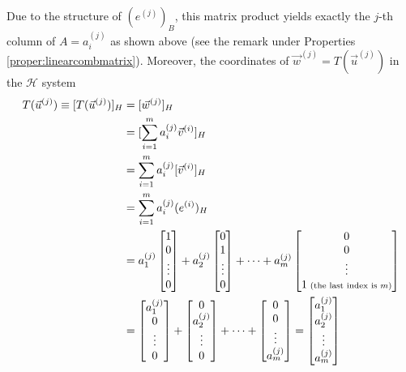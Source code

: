 Due to the structure of $(e^{(j)})_B$, this matrix product yields exactly the $j$-th column of $A = a_i^{(j)}$ as shown above (see the remark under Properties \ref{proper:linearcombmatrix}). Moreover, the coordinates of $\vec{w}^{(j)} = T(\vec{u}^{(j)})$ in the $\mathcal{H}$ system
\begin{align*}
T(\vec{u}^{(j)}) \equiv [T(\vec{u}^{(j)})]_H &= [\vec{w}^{(j)}]_H \\
&= [\sum_{i=1}^{m} a_i^{(j)}\vec{v}^{(i)}]_H \\
&= \sum_{i=1}^{m} a_i^{(j)}[\vec{v}^{(i)}]_H \\
&= \sum_{i=1}^{m} a_i^{(j)}(e^{(i)})_H \\
&=  a_1^{(j)} \begin{bmatrix}
1 \\
0 \\
\vdots \\
0
\end{bmatrix}
+
a_2^{(j)} \begin{bmatrix}
0 \\
1 \\
\vdots \\
0
\end{bmatrix}
+ \cdots
+
a_m^{(j)} \begin{bmatrix}
0 \\
0 \\
\vdots \\
1 {\scriptsize \text{ (the last index is $m$)}}
\end{bmatrix}
\\
&= \begin{bmatrix}
a_1^{(j)} \\
0 \\
\vdots \\
0
\end{bmatrix}
+
\begin{bmatrix}
0 \\
a_2^{(j)} \\
\vdots \\
0
\end{bmatrix}
+ \cdots
+
\begin{bmatrix}
0 \\
0 \\
\vdots \\
a_m^{(j)}
\end{bmatrix}
=
\begin{bmatrix}
a_1^{(j)} \\
a_2^{(j)} \\
\vdots \\
a_m^{(j)}
\end{bmatrix}
\end{align*}

